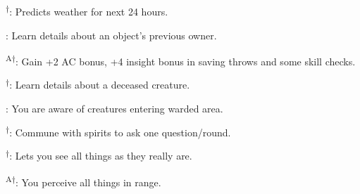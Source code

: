 \begin{enumerate*}
\textsuperscript{$\dagger$}: Predicts weather for next 24 hours.

\item {}: Learn details about an object's previous owner.

\textsuperscript{A$\dagger$}: Gain +2 AC bonus, +4 insight bonus in saving throws and some skill checks.

\item {}\textsuperscript{$\dagger$}: Learn details about a deceased creature.

: You are aware of creatures entering warded area.

\item 
\item {}\textsuperscript{$\dagger$}: Commune with spirits to ask one question/round.

\textsuperscript{$\dagger$}: Lets you see all things as they really are.

\item {}\textsuperscript{A$\dagger$}: You perceive all things in range.
\end{enumerate*}



